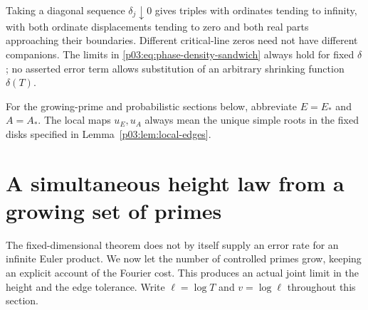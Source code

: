 \documentclass[11pt,letterpaper]{article}
\theoremstyle{definition}
\theoremstyle{remark}
\newcommand{\1}{\mathbf 1}
\begin{document}
Taking a diagonal sequence $\delta_j\downarrow0$ gives triples with
ordinates tending to infinity, with both ordinate displacements
tending to zero and both real parts approaching their boundaries.
Different critical-line zeros need not have different companions.
The limits in \eqref{p03:eq:phase-density-sandwich} always hold for
fixed $\delta$; no asserted error term allows substitution of an
arbitrary shrinking function $\delta(T)$.




For the growing-prime and probabilistic sections below, abbreviate
$E=E_*$ and $A=A_*$. The local maps $u_E,u_A$ always mean the
unique simple roots in the fixed disks specified in
Lemma~\ref{p03:lem:local-edges}.



\section{A simultaneous height law from a growing set of primes}
\label{p04:sec:growing-primes}

The fixed-dimensional theorem does not by itself supply an error rate
for an infinite Euler product. We now let the number of controlled
primes grow, keeping an explicit account of the Fourier cost. This
produces an actual joint limit in the height and the edge tolerance.
Write $\ell=\log T$ and $v=\log\ell$ throughout this section.
\end{document}
